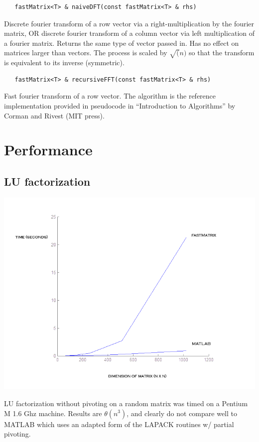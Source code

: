 \documentclass[10pt,fullpage]{article}
\begin{document}
\begin{verbatim}
   fastMatrix<T> & naiveDFT(const fastMatrix<T> & rhs)
\end{verbatim}

Discrete fourier transform of a row vector via a
right-multiplication by the fourier matrix, OR discrete fourier
transform of a column vector via left multiplication of a fourier
matrix. Returns the same type of vector passed in. Has no effect on
matrices larger than vectors. The process is scaled by $ \sqrt(n) $
so that the transform is equivalent to its inverse (symmetric).

\begin{verbatim}
   fastMatrix<T> & recursiveFFT(const fastMatrix<T> & rhs)
\end{verbatim}

Fast fourier transform of a row vector. The algorithm is the
reference implementation provided in pseudocode in ``Introduction to
Algorithms'' by Corman and Rivest (MIT press).

\section{Performance}

\subsection{LU factorization}

\includegraphics[scale=0.5]{./test_results/LU_decomp_np_vs_MATLAB.png}

LU factorization without pivoting on a random matrix was timed on a
Pentium M 1.6 Ghz machine. Results are $\theta(n^3)$, and clearly do
not compare well to MATLAB which uses an adapted form of the LAPACK
routines w/ partial pivoting.
\end{document}
